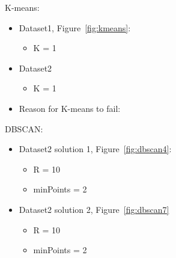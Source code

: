 \documentclass[10pt,a4paper]{article}
\begin{document}
\begin{mdframed}
K-means:
    \begin{itemize}
        \item Dataset1, Figure~\ref{fig:kmeans}:
        \begin{itemize}
            \item K = 1 %
        \end{itemize}
        \item Dataset2        
        \begin{itemize}
            \item K = 1 %
        \end{itemize}
        \item Reason for K-means to fail: %
    \end{itemize}
DBSCAN:
    \begin{itemize}
        \item Dataset2 solution 1, Figure~\ref{fig:dbscan4}:
        \begin{itemize}
            \item R = 10 %
            \item minPoints = 2 %
        \end{itemize} 
        \item Dataset2 solution 2, Figure~\ref{fig:dbscan7}
        \begin{itemize}
            \item R = 10 %
            \item minPoints = 2 %
        \end{itemize} 
    \end{itemize}
\end{mdframed}
\end{document}
